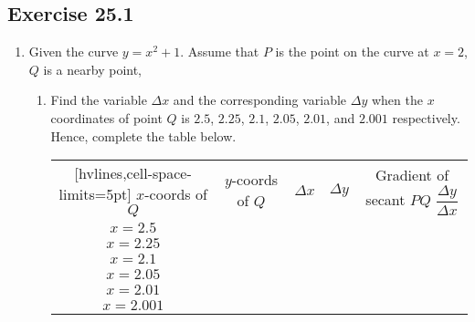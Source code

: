 \documentclass[12pt]{report}
\begin{document}
\newpage
\subsection{Exercise 25.1}

\begin{enumerate}
    \item Given the curve $y = x^2 + 1$. Assume that $P$ is the point on the curve at $x
              = 2$, $Q$ is a nearby point,
          \begin{enumerate}
              \item Find the variable $\Delta x$ and the corresponding variable $\Delta y$ when the
                    $x$ coordinates of point $Q$ is $2.5$, $2.25$, $2.1$, $2.05$, $2.01$, and
                    $2.001$ respectively. Hence, complete the table below.
                    \begin{center}
                        \begin{NiceTabular}{|c|c|c|c|c|}[hvlines,cell-space-limits=5pt]
                            $x$-coords of $Q$ & $y$-coords of $Q$ & $\Delta x$ & $\Delta y$ & Gradient of secant $PQ$ $\dfrac{\Delta y}{\Delta x}$ \\
                            $x = 2.5$                    &                              &            &            &                              \\
                            $x = 2.25$                   &                              &            &            &                              \\
                            $x = 2.1$                    &                              &            &            &                              \\
                            $x = 2.05$                   &                              &            &            &                              \\
                            $x = 2.01$                   &                              &            &            &                              \\
                            $x = 2.001$                  &                              &            &            &                              \\
                        \end{NiceTabular}
                    \end{center}
                    \sol{}


\end{enumerate}
\end{enumerate}
\end{document}
